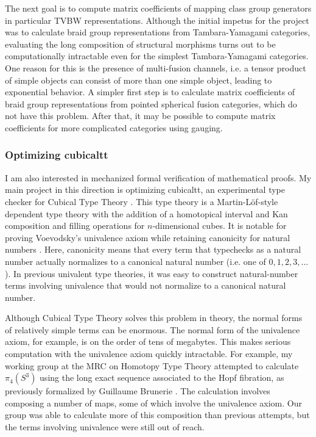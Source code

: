 \documentclass[12pt]{article}
\theoremstyle{definition}
\begin{document}
The next goal is to compute matrix coefficients of mapping class group generators in particular TVBW representations.   Although the initial impetus for the project was to calculate braid group representations from Tambara-Yamagami categories, evaluating the long composition of structural morphisms turns out to be computationally intractable even for the simplest Tambara-Yamagami categories.  One reason for this is the presence of multi-fusion channels, i.e. a tensor product of simple objects can consist of more than one simple object, leading to exponential behavior. A simpler first step is to calculate matrix coefficients of braid group representations from pointed spherical fusion categories, which do not have this problem.  After that, it may be possible to compute matrix coefficients for more complicated categories using gauging.

\subsubsection*{Optimizing cubicaltt} %
I am also interested in mechanized formal verification of mathematical proofs.  My main project in this direction is optimizing cubicaltt, an experimental type checker for Cubical Type Theory \cite{ctt1, ctt2} .  This type theory is a Martin-L\"of-style dependent type theory with the addition of a homotopical interval and Kan composition and filling operations for $n$-dimensional cubes.  It is notable for proving Voevodsky's univalence axiom while retaining canonicity for natural numbers \cite{h}.  Here, canonicity means that every term that typechecks as a natural number actually normalizes to a canonical natural number (i.e. one of $0, 1, 2, 3, \ldots$).  In previous univalent type theories, it was easy to construct natural-number terms involving univalence that would not normalize to a canonical natural number.


Although Cubical Type Theory solves this problem in theory, the normal forms of relatively simple terms can be enormous.  The normal form of the univalence axiom, for example, is on the order of tens of megabytes.  This makes serious computation with the univalence axiom quickly intractable.  For example, my working group at the MRC on Homotopy Type Theory attempted to calculate $\pi_4(S^3)$ using the long exact sequence associated to the Hopf fibration, as previously formalized by Guillaume Brunerie \cite{gb}.  The calculation involves composing a number of maps, some of which involve the univalence axiom.  Our group was able to calculate more of this composition than previous attempts, but the terms involving univalence were still out of reach.
\end{document}
